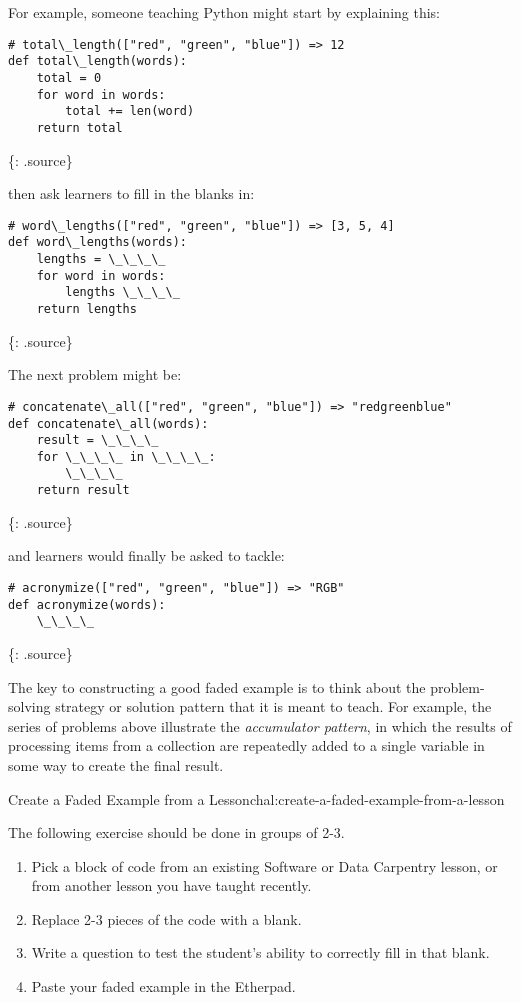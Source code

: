 For example, someone teaching Python might start by explaining this:

\begin{verbatim}
# total\_length(["red", "green", "blue"]) => 12
def total\_length(words):
    total = 0
    for word in words:
        total += len(word)
    return total
\end{verbatim}

\{: .source\}

then ask learners to fill in the blanks in:

\begin{verbatim}
# word\_lengths(["red", "green", "blue"]) => [3, 5, 4]
def word\_lengths(words):
    lengths = \_\_\_\_
    for word in words:
        lengths \_\_\_\_
    return lengths
\end{verbatim}

\{: .source\}

The next problem might be:

\begin{verbatim}
# concatenate\_all(["red", "green", "blue"]) => "redgreenblue"
def concatenate\_all(words):
    result = \_\_\_\_
    for \_\_\_\_ in \_\_\_\_:
        \_\_\_\_
    return result
\end{verbatim}

\{: .source\}

and learners would finally be asked to tackle:

\begin{verbatim}
# acronymize(["red", "green", "blue"]) => "RGB"
def acronymize(words):
    \_\_\_\_
\end{verbatim}

\{: .source\}

The key to constructing a good faded example is to think about the
problem-solving strategy or solution pattern that it is meant to teach.
For example, the series of problems above illustrate the
\emph{accumulator pattern}, in which the results of processing items
from a collection are repeatedly added to a single variable in some way
to create the final result.

\begin{challenge}{Create a Faded Example from a Lesson}{chal:create-a-faded-example-from-a-lesson}

The following exercise should be done in groups of 2-3.

\begin{enumerate}
\item
  Pick a block of code from an existing Software or Data Carpentry
  lesson, or from another lesson you have taught recently.
\item
  Replace 2-3 pieces of the code with a blank.
\item
  Write a question to test the student's ability to correctly fill in
  that blank.
\item
  Paste your faded example in the Etherpad.
\end{enumerate}
\end{challenge}

